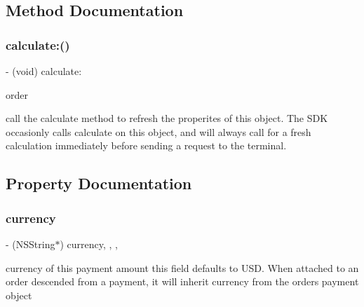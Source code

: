 \subsection{Method Documentation}
\hypertarget{interface_poynt_payment_amount_object_a1c43473c035627846e64fddfb2bbe57d}{}\label{interface_poynt_payment_amount_object_a1c43473c035627846e64fddfb2bbe57d} 
\subsubsection{\texorpdfstring{calculate\+:()}{calculate:()}}
{\footnotesize\ttfamily -\/ (void) calculate\+: \begin{DoxyParamCaption}\item[{(\hyperlink{interface_poynt_order_object}{Poynt\+Order\+Object} $\ast$)}]{order }\end{DoxyParamCaption}}



call the calculate method to refresh the properites of this object. The S\+DK occasionly calls calculate on this object, and will always call for a fresh calculation immediately before sending a request to the terminal. 



\subsection{Property Documentation}
\hypertarget{interface_poynt_payment_amount_object_a71a9104f71558df8791cedc5e81941a3}{}\label{interface_poynt_payment_amount_object_a71a9104f71558df8791cedc5e81941a3} 
\subsubsection{\texorpdfstring{currency}{currency}}
{\footnotesize\ttfamily -\/ (N\+S\+String$\ast$) currency\hspace{0.3cm}{\ttfamily [read]}, {\ttfamily [write]}, {\ttfamily [nonatomic]}, {\ttfamily [strong]}}



currency of this payment amount  this field defaults to U\+SD. When attached to an order descended from a payment, it will inherit currency from the order\textquotesingle{}s payment object 



